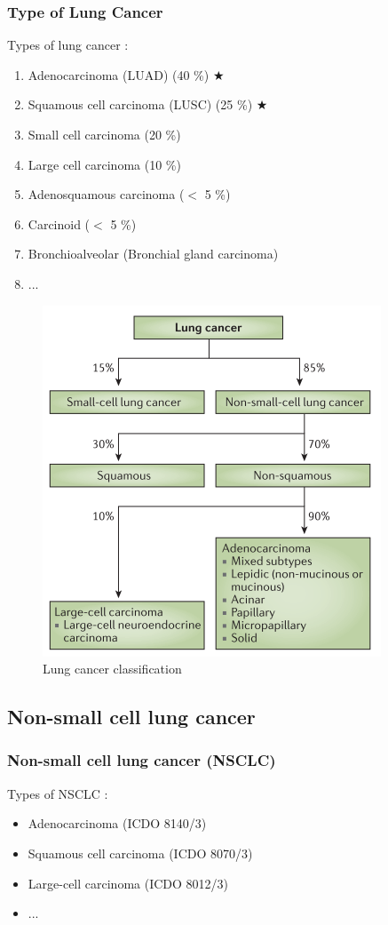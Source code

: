 \documentclass{beamer}
\begin{document}
    \begin{frame}[allowframebreaks]
        \frametitle{Type of Lung Cancer}

        Types of lung cancer \cite{lung2}:
        \begin{enumerate}
            \item Adenocarcinoma (LUAD) (40 \%) $\bigstar$
            \item Squamous cell carcinoma (LUSC) (25 \%) $\bigstar$
            \item Small cell carcinoma (20 \%)
            \item Large cell carcinoma (10 \%)
            \item Adenosquamous carcinoma ($<$ 5 \%)
            \item Carcinoid ($<$ 5 \%)
            \item Bronchioalveolar (Bronchial gland carcinoma)
            \item ...
        \end{enumerate}

        \begin{figure}
            \includegraphics[width=0.5 \linewidth]{figures/LungCancer/classification.png}
            \caption{Lung cancer classification \protect\cite{NSCLC-3}}
        \end{figure}
    \end{frame}

    \subsection{Non-small cell lung cancer}
    \begin{frame}
        \frametitle{Non-small cell lung cancer (NSCLC)}

        Types of NSCLC \cite{NSCLC-1}:
        \begin{itemize}
            \item Adenocarcinoma (ICDO 8140/3)
            \item Squamous cell carcinoma (ICDO 8070/3)
            \item Large-cell carcinoma (ICDO 8012/3)
            \item ...
        \end{itemize}
    \end{frame}
\end{document}
